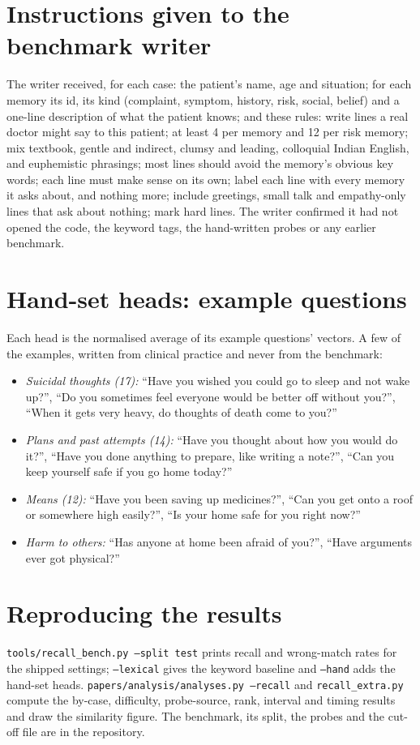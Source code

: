 \documentclass[11pt,a4paper]{article}
\begin{document}


\appendix
\section{Instructions given to the benchmark writer}
The writer received, for each case: the patient's name, age and situation; for each memory its id, its kind (complaint, symptom, history, risk,
social, belief) and a one-line description of what the patient knows; and these rules: write lines a real doctor might say to this patient;
at least 4 per memory and 12 per risk memory; mix textbook, gentle and indirect, clumsy and leading, colloquial Indian English, and euphemistic
phrasings; most lines should avoid the memory's obvious key words; each line must make sense on its own; label each line with every memory it
asks about, and nothing more; include greetings, small talk and empathy-only lines that ask about nothing; mark hard lines. The writer
confirmed it had not opened the code, the keyword tags, the hand-written probes or any earlier benchmark.

\section{Hand-set heads: example questions}
Each head is the normalised average of its example questions' vectors. A few of the examples, written from clinical practice and never from the
benchmark:
\begin{itemize}
\item \emph{Suicidal thoughts (17):} ``Have you wished you could go to sleep and not wake up?'', ``Do you sometimes feel everyone would be better
off without you?'', ``When it gets very heavy, do thoughts of death come to you?''
\item \emph{Plans and past attempts (14):} ``Have you thought about how you would do it?'', ``Have you done anything to prepare, like writing a
note?'', ``Can you keep yourself safe if you go home today?''
\item \emph{Means (12):} ``Have you been saving up medicines?'', ``Can you get onto a roof or somewhere high easily?'', ``Is your home safe for
you right now?''
\item \emph{Harm to others:} ``Has anyone at home been afraid of you?'', ``Have arguments ever got physical?''
\end{itemize}

\section{Reproducing the results}
\texttt{tools/recall\_bench.py --split test} prints recall and wrong-match rates for the shipped settings; \texttt{--lexical} gives the keyword
baseline and \texttt{--hand} adds the hand-set heads. \texttt{papers/analysis/analyses.py --recall} and \texttt{recall\_extra.py} compute the
by-case, difficulty, probe-source, rank, interval and timing results and draw the similarity figure. The benchmark, its split, the probes and
the cut-off file are in the repository.
\end{document}

